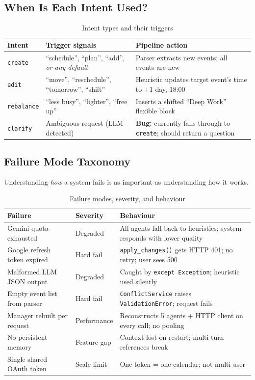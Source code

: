 \documentclass[12pt, a4paper]{article}
\begin{document}
\subsection{When Is Each Intent Used?}

\begin{table}[htbp]
\centering
\renewcommand{\arraystretch}{1.4}
\begin{tabularx}{\textwidth}{L{2.2cm} L{4.5cm} X}
\toprule
\textbf{Intent} & \textbf{Trigger signals} & \textbf{Pipeline action} \\
\midrule
\texttt{create}
  & ``schedule'', ``plan'', ``add'', \emph{or any default}
  & Parser extracts new events; all events are new \\
\texttt{edit}
  & ``move'', ``reschedule'', ``tomorrow'', ``shift''
  & Heuristic updates target event's time to +1 day, 18:00 \\
\texttt{rebalance}
  & ``less busy'', ``lighter'', ``free up''
  & Inserts a shifted ``Deep Work'' flexible block \\
\texttt{clarify}
  & Ambiguous request (LLM-detected)
  & \textbf{Bug:} currently falls through to \texttt{create}; should return a question \\
\bottomrule
\end{tabularx}
\caption{Intent types and their triggers}
\end{table}

\subsection{Failure Mode Taxonomy}

Understanding \emph{how} a system fails is as important as understanding how it works.

\begin{table}[htbp]
\centering
\small
\renewcommand{\arraystretch}{1.4}
\begin{tabularx}{\textwidth}{L{3.8cm} L{2.2cm} X}
\toprule
\textbf{Failure} & \textbf{Severity} & \textbf{Behaviour} \\
\midrule
Gemini quota exhausted
  & Degraded
  & All agents fall back to heuristics; system responds with lower quality \\
Google refresh token expired
  & Hard fail
  & \texttt{apply\_changes()} gets HTTP 401; no retry; user sees 500 \\
Malformed LLM JSON output
  & Degraded
  & Caught by \texttt{except Exception}; heuristic used silently \\
Empty event list from parser
  & Hard fail
  & \texttt{ConflictService} raises \texttt{ValidationError}; request fails \\
Manager rebuilt per request
  & Performance
  & Reconstructs 5 agents + HTTP client on every call; no pooling \\
No persistent memory
  & Feature gap
  & Context lost on restart; multi-turn references break \\
Single shared OAuth token
  & Scale limit
  & One token = one calendar; not multi-user \\
\bottomrule
\end{tabularx}
\caption{Failure modes, severity, and behaviour}
\end{table}
\end{document}
